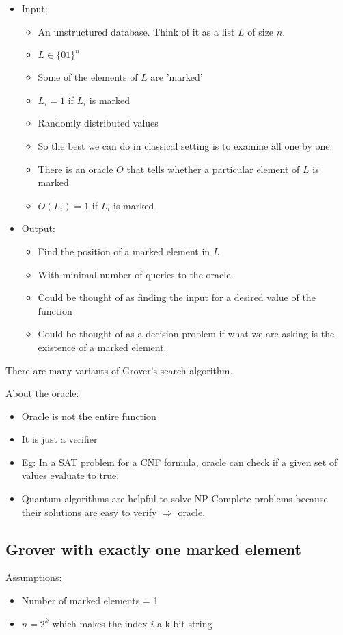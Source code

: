 \documentclass[12pt]{article}
\begin{document}
\begin{itemize}
\item Input:
  \begin{itemize}
  \item An unstructured database. Think of it as a list $L$ of size $n$.
  \item $L \in \{01\}^n$
  \item Some of the elements of $L$ are 'marked'
  \item $L_i = 1$ if $L_i$ is marked
  \item Randomly distributed values
  \item
    So the best we can do in classical setting is to examine all one
    by one.
  \item There is an oracle $O$ that tells whether a particular element of
    $L$ is marked 
  \item $O(L_i) = 1$ if $L_i$ is marked
  \end{itemize}
\item Output:
  \begin{itemize}
  \item Find the position of a marked element in $L$
  \item With minimal number of queries to the oracle
  \item
    Could be thought of as finding the input for a desired value of
    the function
  \item
    Could be thought of as a decision problem if what we are
    asking is the existence of a marked element.
  \end{itemize}
\end{itemize}

There are many variants of Grover's search algorithm.

About the oracle:

\begin{itemize}
\item Oracle is not the entire function
\item It is just a verifier
\item Eg: In a SAT problem for a CNF formula, oracle can check if a
  given set of values evaluate to true. 
\item 
  Quantum algorithms are helpful to solve NP-Complete problems because
  their solutions are easy to verify $\Rightarrow$ oracle.
\end{itemize}

\subsection{Grover with exactly one marked element}
Assumptions:
\begin{itemize}
\item Number of marked elements = 1
\item $n = 2^k$ which makes the index $i$ a k-bit string
\end{itemize}
\end{document}
